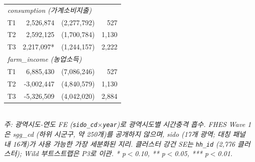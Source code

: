 \begin{table}[t]
\begin{tabular}{lrrr}
\multicolumn{4}{l}{\textit{consumption (가계소비지출)}} \\
T1 & 2,526,874 & (2,277,792) & 527 \\
T2 & 2,592,125 & (1,700,784) & 1,130 \\
T3 & 2,217,097* & (1,244,157) & 2,222 \\
\multicolumn{4}{l}{\textit{farm\_income (농업소득)}} \\
T1 & 6,885,430 & (7,086,246) & 527 \\
T2 & -3,002,447 & (4,840,579) & 1,130 \\
T3 & -5,326,509 & (4,042,020) & 2,884 \\
\bottomrule
\end{tabular}
\\
\footnotesize\textit{주: 광역시도-연도 FE (\texttt{sido\_cd}$\times$\texttt{year})로 광역시도별 시간충격 흡수. FHES Wave 1은 sgg\_cd (하위 시군구, 약 250개)를 공개하지 않으며, sido (17개 광역; 대칭 패널 내 16개)가 사용 가능한 가장 세분화된 지리. 클러스터 강건 SE는 \texttt{hh\_id} (2,776 클러스터); Wild 부트스트랩은 P3로 이관. * p$<$0.10, ** p$<$0.05, *** p$<$0.01.}
\end{table}

